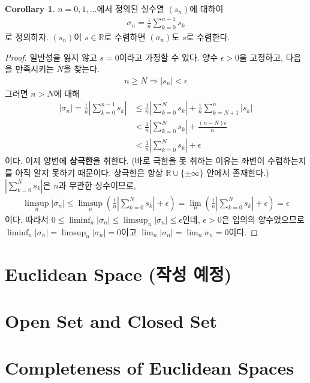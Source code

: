 \documentclass[12pt]{article}
\theoremstyle{definition}
\newtheorem{cor}[thm]{Corollary}
\def\RR{\mathbb{R}}
\def\eps{\epsilon}
\newcommand{\abs}[1]{\left\vert#1\right\vert}
\begin{document}
	\begin{cor}
		\(n = 0, 1, \ldots\)에서 정의된 실수열 \((s_n)\)에 대하여
		\begin{gather*}
			\sigma_n = \frac{1}{n}\sum_{k=0}^{n-1}s_k
		\end{gather*}
		로 정의하자. \((s_n)\)이 \(s \in \RR\)로 수렴하면 \((\sigma_n)\)도 \(s\)로 수렴한다.
	\end{cor}
	\begin{proof}
		일반성을 잃지 않고 \(s = 0\)이라고 가정할 수 있다. 양수 \(\eps > 0\)을 고정하고, 다음을 만족시키는 \(N\)을 찾는다.
		\begin{gather*}
			n \ge N \Longrightarrow \abs{s_n} < \eps
		\end{gather*}
		그러면 \(n > N\)에 대해
		\begin{align*}
			\abs{\sigma_n} = \frac{1}{n}\abs{\sum_{k=0}^{n-1}s_k} &\le \frac{1}{n}\abs{\sum_{k=0}^{N}s_k} + \frac{1}{n}\sum_{k=N+1}^{n}\abs{s_k}\\
			&< \frac{1}{n}\abs{\sum_{k=0}^{N}s_k} + \frac{(n-N)\eps}{n}\\
			&<  \frac{1}{n}\abs{\sum_{k=0}^{N}s_k} + \eps
		\end{align*}
		이다. 이제 양변에 \textbf{상극한}을 취한다. (바로 극한을 못 취하는 이유는 좌변이 수렴하는지를 아직 알지 못하기 때문이다. 상극한은 항상 \(\RR \cup \{\pm \infty\}\) 안에서 존재한다.) \(\abs{\sum_{k=0}^{N}s_k}\)은 \(n\)과 무관한 상수이므로,
		\begin{gather*}
			\limsup_n \abs{\sigma_n} \le \limsup_n \left ( \frac{1}{n}\abs{\sum_{k=0}^{N}s_k} + \eps \right )= \lim_n \left ( \frac{1}{n}\abs{\sum_{k=0}^{N}s_k} + \eps \right )= \eps
		\end{gather*}
		이다. 따라서 \(0 \le \liminf_n \abs{\sigma_n} \le \limsup_n \abs{\sigma_n} \le \eps\)인데, \(\eps > 0\)은 임의의 양수였으므로 \(\liminf_n \abs{\sigma_n} = \limsup_n \abs{\sigma_n} = 0\)이고 \(\lim_n \abs{\sigma_n} = \lim_n \sigma_n = 0\)이다.
	\end{proof}



\section{Euclidean Space (작성 예정)}

\section{Open Set and Closed Set}

\section{Completeness of Euclidean Spaces}
\end{document}

